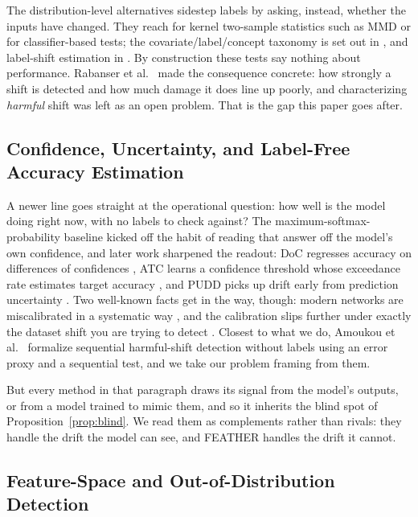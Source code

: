 \documentclass[acmsmall,screen]{acmart}
\theoremstyle{acmdefinition}
\begin{document}
The distribution-level alternatives sidestep labels by asking, instead,
whether the inputs have changed. They reach for kernel two-sample statistics
such as MMD \cite{gretton2012kernel} or for classifier-based tests; the
covariate/label/concept taxonomy is set out in \cite{quinonero2009dataset},
and label-shift estimation in \cite{lipton2018label}. By construction these
tests say nothing about performance. Rabanser et al.\
\cite{rabanser2019failing} made the consequence concrete: how strongly a
shift is detected and how much damage it does line up poorly, and
characterizing \emph{harmful} shift was left as an open problem. That is the
gap this paper goes after.

\subsection{Confidence, Uncertainty, and Label-Free Accuracy Estimation}

A newer line goes straight at the operational question: how well is the model
doing right now, with no labels to check against? The
maximum-softmax-probability baseline \cite{hendrycks2017baseline} kicked off
the habit of reading that answer off the model's own confidence, and later
work sharpened the readout: DoC regresses accuracy on differences of
confidences \cite{guillory2021doc}, ATC learns a confidence threshold whose
exceedance rate estimates target accuracy \cite{garg2022atc}, and PUDD picks
up drift early from prediction uncertainty \cite{pudd2025}. Two well-known
facts get in the way, though: modern networks are miscalibrated in a
systematic way \cite{guo2017calibration}, and the calibration slips further
under exactly the dataset shift you are trying to detect
\cite{ovadia2019trust}. Closest to what we do, Amoukou et al.\
\cite{amoukou2024sequential} formalize sequential harmful-shift detection
without labels using an error proxy and a sequential test, and we take our
problem framing from them.

But every method in that paragraph draws its signal from the model's outputs,
or from a model trained to mimic them, and so it inherits the blind spot of
Proposition~\ref{prop:blind}. We read them as complements rather than rivals:
they handle the drift the model can see, and FEATHER handles the drift it
cannot.

\subsection{Feature-Space and Out-of-Distribution Detection}
\end{document}
